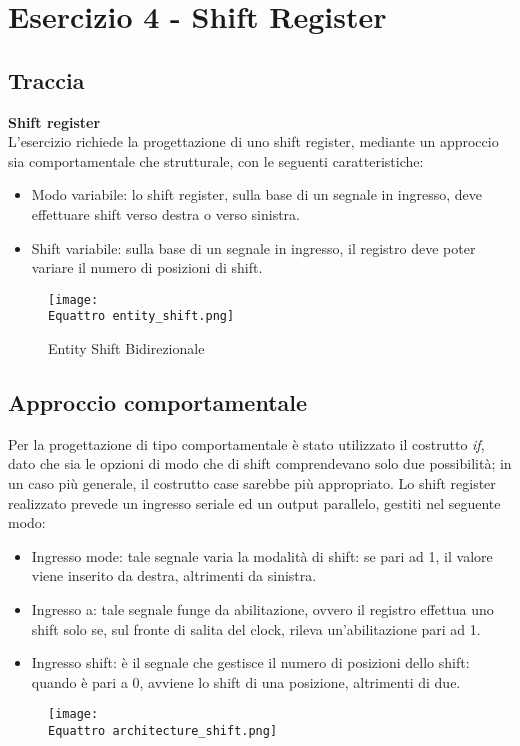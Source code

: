 \documentclass[12pt]{article}
\def \Equattro {Allegati/Esercizio4/}
\begin{document}
\section{Esercizio 4 - Shift Register}
\subsection{Traccia}
{\large \textbf{Shift register}}
\\L’esercizio richiede la progettazione di uno shift register, mediante un approccio sia comportamentale che strutturale, con le seguenti caratteristiche:
\begin{itemize}
    \item Modo variabile: lo shift register, sulla base di un segnale in ingresso, deve effettuare shift verso destra o verso sinistra.
    \item Shift variabile: sulla base di un segnale in ingresso, il registro deve poter variare il numero di posizioni di shift.
\end{itemize}
\begin{figure}[ht!]
    \centering
    \texttt{[image: \\Equattro entity\_shift.png]}
    \caption{Entity Shift Bidirezionale}
\end{figure}
\subsection{Approccio comportamentale}
Per la progettazione di tipo comportamentale è stato utilizzato il costrutto \textit{if}, dato che sia le opzioni di modo che di shift comprendevano solo due possibilità; in un caso più generale, il costrutto case sarebbe più appropriato.
Lo shift register realizzato prevede un ingresso seriale ed un output parallelo, gestiti nel seguente modo:
\begin{itemize}
    \item Ingresso mode: tale segnale varia la modalità di shift: se pari ad 1, il valore viene inserito da destra, altrimenti da sinistra.
    \item Ingresso a: tale segnale funge da abilitazione, ovvero il registro effettua uno shift solo se, sul fronte di salita del clock, rileva un’abilitazione pari ad 1.
    \item Ingresso shift: è il segnale che gestisce il numero di posizioni dello shift: quando è pari a 0, avviene lo shift di una posizione, altrimenti di due.
\end{itemize}
\begin{figure}[ht!]
    \centering
    \texttt{[image: \\Equattro architecture\_shift.png]}

\end{figure}
\end{document}
